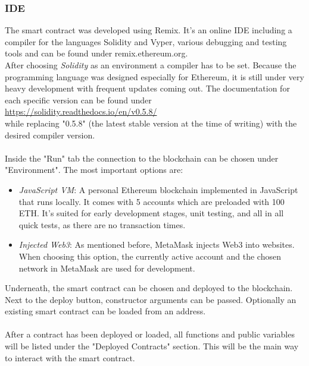 \subsubsection{IDE}
The smart contract was developed using Remix.
It's an online IDE including a compiler for the languages Solidity and Vyper, various debugging and testing tools and can be found under remix.ethereum.org.
\\
After choosing \textit{Solidity} as an environment a compiler has to be set.
Because the programming language was designed especially for Ethereum, it is still under very heavy development with frequent updates coming out.
The documentation for each specific version can be found under
\\
\url{https://solidity.readthedocs.io/en/v0.5.8/}
\\
while replacing "0.5.8" (the latest stable version at the time of writing) with the desired compiler version.
\\\\
Inside the "Run" tab the connection to the blockchain can be chosen under "Environment".
The most important options are:
\begin{itemize}
    \item \textit{JavaScript VM}: A personal Ethereum blockchain implemented in JavaScript that runs locally.
    It comes with 5 accounts which are preloaded with 100 ETH.
    It's suited for early development stages, unit testing, and all in all quick tests, as there are no transaction times.
    \item \textit{Injected Web3}: As mentioned before, MetaMask injects Web3 into websites.
    When choosing this option, the currently active account and the chosen network in MetaMask are used for development.
\end{itemize}
Underneath, the smart contract can be chosen and deployed to the blockchain.
Next to the deploy button, constructor arguments can be passed.
Optionally an existing smart contract can be loaded from an address.
\\\\
After a contract has been deployed or loaded, all functions and public variables will be listed under the "Deployed Contracts" section.
This will be the main way to interact with the smart contract.
\\\\
